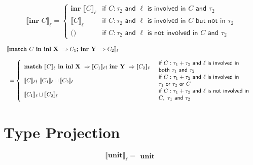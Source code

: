 \documentclass{article}
\begin{document}
$$
 \llbracket  \textbf{inr } C \rrbracket _\ell = \left\{
    \begin{array}{ll}
    \textbf{inr }\llbracket     C \rrbracket _\ell & \textsf{if } C : \tau_2 \textsf{ and } \ell \textsf{ is involved in } C \textsf{ and } \tau_2 \\
    \llbracket     C \rrbracket _\ell & \textsf{if } C : \tau_2 \textsf{ and } \ell \textsf{ is involved in } C \textsf{ but not in } \tau_2 \\
    \textbf{()} & \textsf{if } C : \tau_2 \textsf{ and } \ell \textsf{ is not involved in } C \textsf{ and } \tau_2
    \end{array}
\right.
$$

$$\begin{array}{l}
 \llbracket  \textbf{match } C \textbf{ in inl X } \Rightarrow C_1 \textbf{; inr Y } \Rightarrow C_2 \rrbracket _\ell\\ \\ \;\;= \left\{
    \begin{array}{l l}
    \textbf{match }\llbracket C \rrbracket _\ell \textbf{ in inl X } \Rightarrow \llbracket C_1 \rrbracket _\ell \textbf{; inr Y } \Rightarrow \llbracket C_2 \rrbracket _\ell & 
    \begin{array}{l}
    \textsf{if } C : \tau_1 + \tau_2 \textsf{ and } \ell \textsf{ is involved in} \\ \textsf{both } \tau_1 \textsf{ and }\tau_2 
    \end{array}    \\
    \llbracket C \rrbracket _\ell \textbf{; } \llbracket C_1 \rrbracket _\ell \sqcup \llbracket C_2 \rrbracket _\ell & 
    \begin{array}{l}
    \textsf{if } C : \tau_1 + \tau_2 \textsf{ and } \ell \textsf{ is involved in } \\ \tau_1 \textsf{ or } \tau_2 \textsf{ or } C
    \end{array}    \\
    \llbracket C_1 \rrbracket _\ell \sqcup \llbracket C_2 \rrbracket _\ell & 
    \begin{array}{l}
    \textsf{if } C : \tau_1 + \tau_2 \textsf{ and } \ell \textsf{ is not involved in} \\ C, \ \tau_1 \textsf{ and } \tau_2 
    \end{array}
    \end{array}
\right.
\end{array}
$$

\section{Type Projection} 
$$
 \llbracket  \textbf{unit} \rrbracket _\ell =
    \begin{array}{ll}
    \textbf{unit}
    \end{array}
$$
\end{document}

